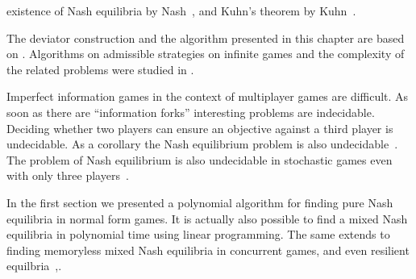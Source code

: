 existence of Nash equilibria by Nash~\cite{Nash:1950,Nash:1951},
and Kuhn's theorem by Kuhn~\cite{Kuhn:1953}.

The deviator construction and the algorithm presented in this chapter are based on \cite{Bouyer&Brenguier&Markey&Ummels:2011,Brenguier:2012}.
Algorithms on admissible strategies on infinite games and the complexity of the related problems
were studied in
\cite{Berwanger:2007,Brenguier&Raskin&Sassolas:2014}.


Imperfect information games in the context of multiplayer games are difficult.
As soon as there are ``information forks'' interesting problems are indecidable.
Deciding whether two players can ensure an objective against a third player
is undecidable.
As a corollary the Nash equilibrium problem is also undecidable~\cite{Pnueli&Rosner:1990}.
The problem of Nash equilibrium is also undecidable in stochastic games even
with only three players~\cite{Bouyer&Markey&Stan:2014}.

In the first section we presented a polynomial algorithm for
finding pure Nash equilibria in normal form games.
It is actually also possible to find a mixed Nash equilibria in
polynomial time using linear programming.
The same extends to finding memoryless mixed Nash equilibria in concurrent
games, and even resilient equilbria~\cite{Brenguier:2016},.

